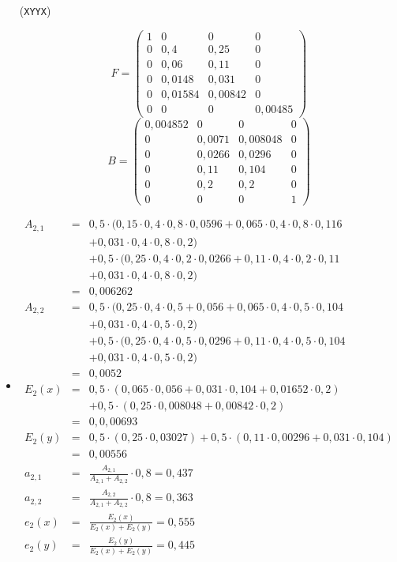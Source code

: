 \documentclass{homework}
\begin{document}
\begin{enumerate}
\begin{itemize}
\item[(\texttt{XYYX})]

$$F = \begin{pmatrix}
1 & 0 & 0 & 0\\
0 & 0,4 & 0,25 & 0\\
0 & 0,06 & 0,11 & 0\\
0 & 0,0148 & 0,031 & 0\\
0 & 0,01584 & 0,00842 & 0\\
0 & 0 & 0 & 0,00485
\end{pmatrix}
$$$$
B = \begin{pmatrix}
0,004852 & 0 & 0 & 0\\
0 & 0,0071 & 0,008048 & 0\\
0 & 0,0266 & 0,0296 & 0\\
0 & 0,11 & 0,104 & 0\\
0 & 0,2 & 0,2 & 0\\
0 & 0 & 0 & 1
\end{pmatrix}$$

\item

\begin{eqnarray*}
A_{2,1} & = & 0,5 \cdot (0,15 \cdot 0,4 \cdot 0,8 \cdot 0,0596 + 0,065 \cdot 0,4 \cdot 0,8 \cdot 0,116\\
&& + 0,031 \cdot 0,4 \cdot 0,8 \cdot 0,2)\\
&& + 0,5 \cdot (0,25 \cdot 0,4 \cdot 0,2 \cdot 0,0266 + 0,11 \cdot 0,4 \cdot 0,2 \cdot 0,11\\
&& + 0,031 \cdot 0,4 \cdot 0,8 \cdot 0,2)\\
& = & 0,006262\\
A_{2,2} & = & 0,5 \cdot (0,25 \cdot 0,4 \cdot 0,5 + 0,056 + 0,065 \cdot 0,4 \cdot 0,5 \cdot 0,104\\
&& + 0,031 \cdot 0,4 \cdot 0,5 \cdot 0,2)\\
&& + 0,5 \cdot (0,25 \cdot 0,4 \cdot 0,5 \cdot 0,0296 + 0,11 \cdot 0,4 \cdot 0,5 \cdot 0,104\\
&& + 0,031 \cdot 0,4 \cdot 0,5 \cdot 0,2)\\
& = & 0,0052\\
E_2(x) & = & 0,5 \cdot (0,065 \cdot 0,056 + 0,031 \cdot 0,104 + 0,01652 \cdot 0,2)\\
&& + 0,5 \cdot (0,25 \cdot 0,008048 + 0,00842 \cdot 0,2)\\
& = & 0,0,00693\\
E_2(y) & = & 0,5 \cdot (0,25 \cdot 0,03027) + 0,5 \cdot (0,11 \cdot 0,00296 + 0,031 \cdot 0,104)\\
& = & 0,00556\\
a_{2,1} & = & \frac{A_{2,1}}{A_{2,1} + A_{2,2}} \cdot 0,8 = 0,437\\
a_{2,2} & = & \frac{A_{2,2}}{A_{2,1} + A_{2,2}} \cdot 0,8 = 0,363\\
e_2(x) & = & \frac{E_2(x)}{E_2(x) + E_2(y)} = 0,555\\
e_2(y) & = & \frac{E_2(y)}{E_2(x) + E_2(y)} = 0,445
\end{eqnarray*}


\end{itemize}
\end{enumerate}
\end{document}
